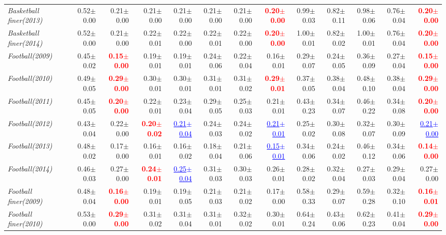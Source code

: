 \documentclass[nohyperref]{article}
\theoremstyle{plain}
\theoremstyle{definition}
\theoremstyle{remark}
\newcommand{\red}[1]{\textcolor{red}{\textbf{#1}}}
\newcommand{\blue}[1]{\textcolor{blue}{\underline{#1}}}
\begin{document}
\begin{table*}[!ht]
{\begin{tabular}{lrr|rrrrr|rrrrr}
			{\it Basketball finer(2013)} & 0.52$\pm$0.00 & 0.21$\pm$0.00 & 0.21$\pm$0.00 & 0.21$\pm$0.00 & 0.21$\pm$0.00 & 0.21$\pm$0.00 & \red{0.20$\pm$0.00} & 0.99$\pm$0.03 & 0.82$\pm$0.11 & 0.98$\pm$0.06 & 0.76$\pm$0.04 & \red{0.20$\pm$0.00} \\
			{\it Basketball finer(2014)} & 0.52$\pm$0.00 & 0.21$\pm$0.00 & 0.22$\pm$0.01 & 0.22$\pm$0.00 & 0.22$\pm$0.01 & 0.22$\pm$0.00 & \red{0.20$\pm$0.00} & 1.00$\pm$0.01 & 0.82$\pm$0.02 & 1.00$\pm$0.01 & 0.76$\pm$0.04 & \red{0.20$\pm$0.00} \\
			{\it Football(2009)} & 0.45$\pm$0.02 & \red{0.15$\pm$0.00} & 0.19$\pm$0.01 & 0.19$\pm$0.01 & 0.24$\pm$0.06 & 0.22$\pm$0.04 & 0.16$\pm$0.01 & 0.29$\pm$0.07 & 0.24$\pm$0.05 & 0.36$\pm$0.09 & 0.27$\pm$0.04 & \red{0.15$\pm$0.00} \\
			{\it Football(2010)} & 0.49$\pm$0.05 & \red{0.29$\pm$0.00} & 0.30$\pm$0.01 & 0.30$\pm$0.01 & 0.31$\pm$0.01 & 0.31$\pm$0.02 & \red{0.29$\pm$0.01} & 0.37$\pm$0.05 & 0.38$\pm$0.04 & 0.48$\pm$0.10 & 0.38$\pm$0.04 & \red{0.29$\pm$0.00} \\
			{\it Football(2011)} & 0.45$\pm$0.05 & \red{0.20$\pm$0.00} & 0.22$\pm$0.01 & 0.23$\pm$0.04 & 0.29$\pm$0.05 & 0.25$\pm$0.03 & 0.21$\pm$0.01 & 0.43$\pm$0.23 & 0.34$\pm$0.07 & 0.46$\pm$0.22 & 0.34$\pm$0.08 & \red{0.20$\pm$0.00} \\
			{\it Football(2012)} & 0.43$\pm$0.04 & 0.22$\pm$0.00 & \red{0.20$\pm$0.02} & \blue{0.21$\pm$0.04} & 0.24$\pm$0.03 & 0.24$\pm$0.02 & \blue{0.21$\pm$0.01} & 0.25$\pm$0.02 & 0.30$\pm$0.08 & 0.32$\pm$0.07 & 0.30$\pm$0.09 & \blue{0.21$\pm$0.00} \\
			{\it Football(2013)} & 0.48$\pm$0.02 & 0.17$\pm$0.00 & 0.16$\pm$0.01 & 0.16$\pm$0.02 & 0.18$\pm$0.04 & 0.21$\pm$0.06 & \blue{0.15$\pm$0.01} & 0.34$\pm$0.06 & 0.24$\pm$0.02 & 0.46$\pm$0.12 & 0.34$\pm$0.06 & \red{0.14$\pm$0.00} \\
			{\it Football(2014)} & 0.46$\pm$0.03 & 0.27$\pm$0.00 & \red{0.24$\pm$0.01} & \blue{0.25$\pm$0.04} & 0.31$\pm$0.03 & 0.30$\pm$0.03 & 0.26$\pm$0.01 & 0.28$\pm$0.02 & 0.32$\pm$0.04 & 0.27$\pm$0.03 & 0.29$\pm$0.04 & 0.27$\pm$0.00 \\
			{\it Football finer(2009)} & 0.48$\pm$0.04 & \red{0.16$\pm$0.00} & 0.19$\pm$0.01 & 0.19$\pm$0.05 & 0.21$\pm$0.03 & 0.21$\pm$0.02 & 0.17$\pm$0.00 & 0.58$\pm$0.33 & 0.29$\pm$0.07 & 0.59$\pm$0.28 & 0.32$\pm$0.10 & \red{0.16$\pm$0.01} \\
			{\it Football finer(2010)} & 0.53$\pm$0.00 & \red{0.29$\pm$0.00} & 0.31$\pm$0.02 & 0.31$\pm$0.04 & 0.31$\pm$0.01 & 0.32$\pm$0.02 & 0.30$\pm$0.01 & 0.64$\pm$0.24 & 0.43$\pm$0.06 & 0.62$\pm$0.23 & 0.41$\pm$0.04 & \red{0.29$\pm$0.00} \\

\end{tabular}}
\end{table*}
\end{document}
